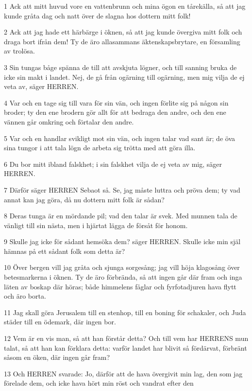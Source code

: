 \par 1 Ack att mitt huvud vore en vattenbrunn och mina ögon en tårekälla, så att jag kunde gråta dag och natt över de slagna hos dottern mitt folk!
\par 2 Ack att jag hade ett härbärge i öknen, så att jag kunde övergiva mitt folk och draga bort ifrån dem! Ty de äro allasammans äktenskapsbrytare, en församling av trolösa.
\par 3 Sin tungas båge spänna de till att avskjuta lögner, och till sanning bruka de icke sin makt i landet. Nej, de gå från ogärning till ogärning, men mig vilja de ej veta av, säger HERREN.
\par 4 Var och en tage sig till vara för sin vän, och ingen förlite sig på någon sin broder; ty den ene brodern gör allt för att bedraga den andre, och den ene vännen går omkring och förtalar den andre.
\par 5 Var och en handlar svikligt mot sin vän, och ingen talar vad sant är; de öva sina tungor i att tala lögn de arbeta sig trötta med att göra illa.
\par 6 Du bor mitt ibland falskhet; i sin falskhet vilja de ej veta av mig, säger HERREN.
\par 7 Därför säger HERREN Sebaot så. Se, jag måste luttra och pröva dem; ty vad annat kan jag göra, då nu dottern mitt folk är sådan?
\par 8 Deras tunga är en mördande pil; vad den talar är svek. Med munnen tala de vänligt till sin nästa, men i hjärtat lägga de försåt för honom.
\par 9 Skulle jag icke för sådant hemsöka dem? säger HERREN. Skulle icke min själ hämnas på ett sådant folk som detta är?
\par 10 Över bergen vill jag gråta och sjunga sorgesång; jag vill höja klagosång över betesmarkerna i öknen. Ty de äro förbrända, så att ingen går där fram och inga läten av boskap där höras; både himmelens fåglar och fyrfotadjuren hava flytt och äro borta.
\par 11 Jag skall göra Jerusalem till en stenhop, till en boning för schakaler, och Juda städer till en ödemark, där ingen bor.
\par 12 Vem är en vis man, så att han förstår detta? Och till vem har HERRENS mun talat, så att han kan förklara detta: varför landet har blivit så fördärvat, förbränt såsom en öken, där ingen går fram?
\par 13 Och HERREN svarade: Jo, därför att de hava övergivit min lag, den som jag förelade dem, och icke hava hört min röst och vandrat efter den
